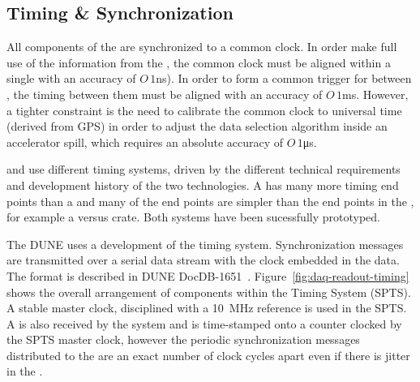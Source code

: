 \subsection{Timing \& Synchronization}
\label{sec:fd-daq-timing}



All components of the  are
synchronized to a common clock.  In order make full use of the
information from the , the common clock must be
aligned within a single  with an accuracy of $O\,1$\si{ns}).
In order to form a common trigger for  between
, the timing between them must be aligned with an
accuracy of $O\,1$\si{ms}.  However, a tighter constraint is the need to
calibrate the common clock to universal time (derived from GPS) in
order to adjust the data selection algorithm inside an accelerator
spill, which requires an absolute accuracy of $O\,1$\si{\micro\s}.

\single and \dual {} use different timing systems,
driven by the different technical requirements and development history
of the two technologies. %
A  has many more
timing end points than a  and many of the end points
are simpler than the end points in the \dual{}, for example a 
versus  crate. Both systems have been sucessfully prototyped.

The DUNE  uses a development of the  
timing system. Synchronization messages are transmitted over a serial
data stream with the clock embedded in the data. The format is
described in DUNE DocDB-1651~\cite{docdb-1651}. Figure~\ref{fig:daq-readout-timing}
shows the overall arrangement of components within the \single
Timing System (SPTS). 
A stable master clock, disciplined with a \SI{10}{\MHz}
reference is used in the SPTS. A  is
also received by the system and is time-stamped onto a counter clocked
by the SPTS master clock, however the periodic synchronization
messages distributed to the   are an exact number
of clock cycles apart even if there is jitter in the .

